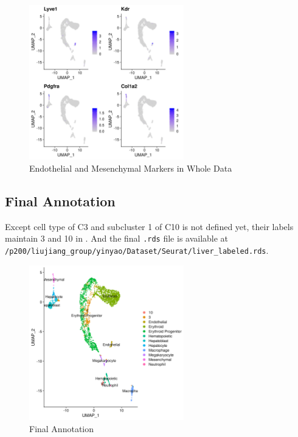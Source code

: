 \documentclass[lang=en]{elegantpaper}
\begin{document}
\begin{figure}[htbp]
    \centering
    \includegraphics[width=0.6\textwidth]{image/f11t.png}
    \caption{Endothelial and Mesenchymal Markers in Whole Data \label{f11t}}
\end{figure}

\subsection{Final Annotation}

Except cell type of C3 and subcluster 1 of C10 is not defined yet, their labels maintain 3 and 10 in . And the final \lstinline{.rds} file is available at \lstinline{/p200/liujiang_group/yinyao/Dataset/Seurat/liver_labeled.rds}.

\begin{figure}[htbp]
    \centering
    \includegraphics[width=0.6\textwidth]{image/dt.png}
    \caption{Final Annotation\label{dt}}
\end{figure}


\end{document}
